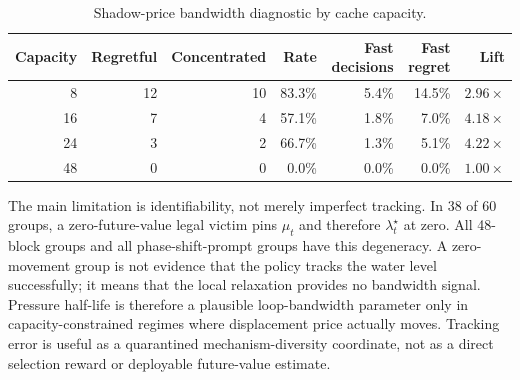 \documentclass[11pt]{article}
\begin{document}
\begin{table}[H]
\centering
\small
{}
\caption{Shadow-price bandwidth diagnostic by workload.}
\label{tab:shadow-price-by-workload}
\end{table}

\begin{table}[H]
\centering
\small
\begin{tabular}{rrrrrrr}
\toprule
Capacity & Regretful & Concentrated & Rate & Fast decisions & Fast regret & Lift \\
\midrule
8 & 12 & 10 & 83.3\% & 5.4\% & 14.5\% & \(2.96\times\) \\
16 & 7 & 4 & 57.1\% & 1.8\% & 7.0\% & \(4.18\times\) \\
24 & 3 & 2 & 66.7\% & 1.3\% & 5.1\% & \(4.22\times\) \\
48 & 0 & 0 & 0.0\% & 0.0\% & 0.0\% & \(1.00\times\) \\
\bottomrule
\end{tabular}
\caption{Shadow-price bandwidth diagnostic by cache capacity.}
\label{tab:shadow-price-by-capacity}
\end{table}

The main limitation is identifiability, not merely imperfect tracking.  In 38 of 60
groups, a zero-future-value legal victim pins \(\mu_t\) and therefore
\(\lambda_t^\star\) at zero.  All 48-block groups and all phase-shift-prompt groups
have this degeneracy.  A zero-movement group is not evidence that the policy tracks the
water level successfully; it means that the local relaxation provides no bandwidth
signal.  Pressure half-life is therefore a plausible loop-bandwidth parameter only in
capacity-constrained regimes where displacement price actually moves.  Tracking error
is useful as a quarantined mechanism-diversity coordinate, not as a direct selection
reward or deployable future-value estimate.
\end{document}
